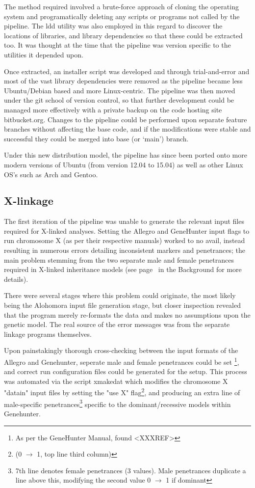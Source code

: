 The method required involved a brute-force approach of cloning the operating system and programatically deleting any scripts or programs not called by the pipeline. The \gls{ldd} utility was also employed in this regard to discover the locations of libraries, and library dependencies so that these could be extracted too. It was thought at the time that the pipeline was version specific to the utilities it depended upon.

Once extracted, an installer script was developed and through trial-and-error and most of the vast library dependencies were removed as the pipeline became less Ubuntu/Debian based and more Linux-centric. The pipeline was then moved under the \gls{git} school of \gls{version control}, so that further development could be managed more effectively with a private backup on the code hosting site bitbucket.org. Changes to the pipeline could be performed upon separate feature branches without affecting the base code, and if the modifications were stable and successful they could be merged into base (or ‘main’) branch. 

Under this new distribution model, the pipeline has since been ported onto more modern versions of Ubuntu (from version 12.04 to 15.04) as well as other Linux OS's such as Arch and Gentoo.


\subsection{X-linkage}

The first iteration of the pipeline was unable to generate the relevant input files required for X-linked analyses. Setting the Allegro and GeneHunter input flags to run chromosome X (as per their respective manuals) worked to no avail, instead resulting in numerous errors detailing inconsistent markers and penetrances; the main problem stemming from the two separate male and female penetrances required in X-linked inheritance models (see page~\pageref{ref:back:xlinkrec} in the Background for more details).

There were several stages where this problem could originate, the most likely being the Alohomora input file generation stage, but closer inspection revealed that the program merely re-formats the data and makes no assumptions upon the genetic model. The real source of the error messages was from the separate linkage programs themselves.

Upon painstakingly thorough cross-checking between the input formats of the Allegro and Genehunter, seperate male and female penetrances could be set \footnote{As per the GeneHunter Manual, found <XXXREF>}, and correct run configuration files could be generated for the setup. This process was automated via the script \gls{xmakedat} which modifies the chromosome X "datain" input files by setting the "use X" flag\footnote{(0 $\rightarrow$ 1, top line third column)}, and producing an extra line of male-specific penetrances\footnote{7th line denotes female penetrances (3 values). Male penetrances duplicate a line above this, modifying the second value 0 $\rightarrow$ 1 if dominant} specific to the dominant/recessive models within Genehunter.

